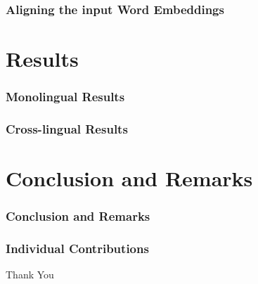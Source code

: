 \documentclass[11pt]{beamer}
\begin{document}
\begin{frame}
\frametitle{Aligning the input Word Embeddings}
\end{frame}

\section{Results}
\begin{frame}
\frametitle{Monolingual Results}
\end{frame}

\begin{frame}
\frametitle{Cross-lingual Results}
\end{frame}

\section{Conclusion and Remarks}
\begin{frame}
\frametitle{Conclusion and Remarks}
\end{frame}

\begin{frame}
\frametitle{Individual Contributions}
\end{frame}

\begin{frame}
\centering
Thank You
\end{frame}


\end{document}

